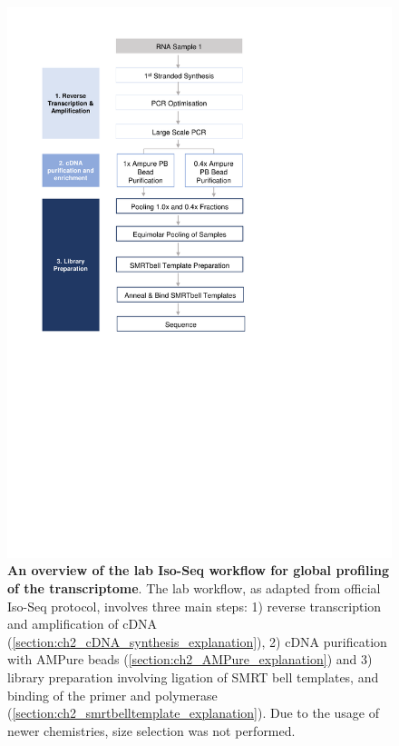 \begin{figure}[htp]
	\includegraphics[page=1,trim={0 12cm 5cm 1cm},clip,scale = 1]{Figures/ProjectDevelopment_Figures.pdf}
	\captionsetup{width=0.95\textwidth}
	\caption[Iso-Seq Lab workflow used for global profiling of the transcriptome]%
	{\textbf{An overview of the lab Iso-Seq workflow for global profiling of the transcriptome}. The lab workflow, as adapted from official Iso-Seq protocol, involves three main steps: 1) reverse transcription and amplification of cDNA (\cref{section:ch2_cDNA_synthesis_explanation}), 2) cDNA purification with AMPure beads (\cref{section:ch2_AMPure_explanation}) and 3) library preparation involving ligation of SMRT bell templates, and binding of the primer and polymerase (\cref{section:ch2_smrtbelltemplate_explanation}). Due to the usage of newer chemistries, size selection was not performed.}
	\label{fig:isoseq_wholelab_protocol}
\end{figure}

